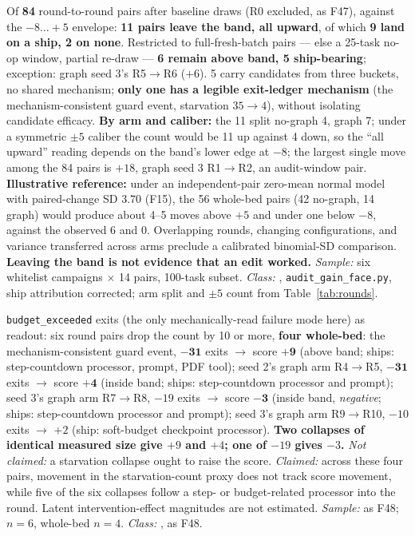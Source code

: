 \begin{description}[leftmargin=0pt,labelindent=0pt,labelsep=0pt,style=nextline,font=\normalfont,itemsep=6pt]
\item[\textbf{F48}\quad The gain face --- above-band moves across all six
      campaigns.]
Of \textbf{84} round-to-round pairs after baseline draws (R0 excluded,
as F47), against the $-8\ldots{+}5$ envelope: \textbf{11 pairs leave
the band, all upward}, of which \textbf{9 land on a ship, 2 on none}.
Restricted to full-fresh-batch pairs --- else a 25-task no-op window,
partial re-draw --- \textbf{6 remain above band, 5 ship-bearing};
exception: graph seed 3's R5$\to$R6 ($+6$). 5 carry candidates from three
buckets, no shared mechanism; \textbf{only one has a legible exit-ledger
mechanism} (the mechanism-consistent guard event, starvation $35 \to 4$),
without isolating candidate efficacy. \textbf{By arm and caliber:} the 11
split no-graph 4, graph 7; under a symmetric $\pm 5$ caliber the count
would be 11 up against 4 down, so the ``all upward'' reading depends on the
band's lower edge at $-8$; the largest single move among the 84 pairs is $+18$, graph
seed 3 R1$\to$R2, an audit-window pair.
\textbf{Illustrative reference:} under an independent-pair zero-mean normal
model with paired-change SD $3.70$ (F15), the 56 whole-bed pairs (42
no-graph, 14 graph) would produce about 4--5 moves above $+5$ and under one
below $-8$, against the observed 6 and 0. Overlapping rounds, changing
configurations, and variance transferred across arms preclude a calibrated
binomial-SD comparison.
\textbf{Leaving the band is not evidence that an edit worked.}
\emph{Sample:} six whitelist campaigns $\times$ 14 pairs, 100-task
subset. \emph{Class:} , \texttt{audit\_gain\_face.py}, ship attribution
corrected; arm split and $\pm 5$ count from Table~\ref{tab:rounds}.

\item[\textbf{F49}\quad Starvation-count proxy and score movement differ
      across selected whole-bed pairs.]
\texttt{budget\_exceeded} exits (the only mechanically-read failure
mode here) as readout: six round pairs drop the count by 10 or more,
\textbf{four whole-bed}: the mechanism-consistent guard event,
$\mathbf{-31}$ exits $\to$ score $\mathbf{+9}$ (above band; ships:
step-countdown processor, prompt, PDF tool); seed 2's graph arm R4$\to$R5,
$\mathbf{-31}$ exits $\to$ score $\mathbf{+4}$ (inside band; ships:
step-countdown processor and prompt); seed 3's graph arm R7$\to$R8, $-19$
exits $\to$ score $\mathbf{-3}$ (inside band, \emph{negative}; ships:
step-countdown processor and prompt); seed 3's graph arm R9$\to$R10,
$-10$ exits $\to$ $+2$ (ship: soft-budget checkpoint processor). \textbf{Two
collapses of identical measured size give $+9$ and $+4$; one of $-19$
gives $-3$.} \emph{Not claimed:} a starvation collapse ought to raise the
score. \emph{Claimed:} across these four pairs, movement in the
starvation-count proxy does not track score movement, while five of the six
collapses follow a step- or budget-related processor into the round.
Latent intervention-effect magnitudes are not estimated. \emph{Sample:}
as F48; $n=6$, whole-bed $n=4$. \emph{Class:} , as F48.


\end{description}
